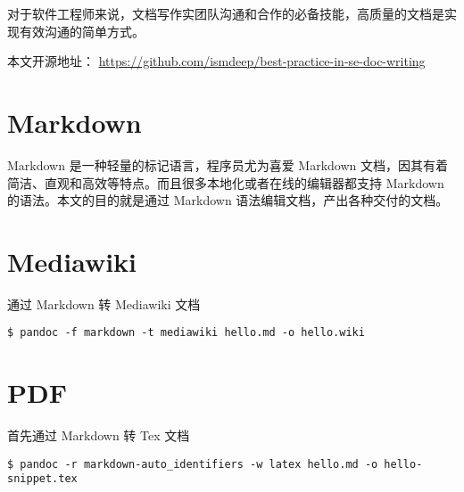 对于软件工程师来说，文档写作实团队沟通和合作的必备技能，高质量的文档是实现有效沟通的简单方式。

本文开源地址：
\url{https://github.com/ismdeep/best-practice-in-se-doc-writing}

\section{Markdown}

Markdown 是一种轻量的标记语言，程序员尤为喜爱 Markdown
文档，因其有着简洁、直观和高效等特点。而且很多本地化或者在线的编辑器都支持
Markdown 的语法。本文的目的就是通过 Markdown
语法编辑文档，产出各种交付的文档。

\section{Mediawiki}

通过 Markdown 转 Mediawiki 文档

\begin{verbatim}
$ pandoc -f markdown -t mediawiki hello.md -o hello.wiki
\end{verbatim}

\section{PDF}

首先通过 Markdown 转 Tex 文档

\begin{verbatim}
$ pandoc -r markdown-auto_identifiers -w latex hello.md -o hello-snippet.tex
\end{verbatim}
